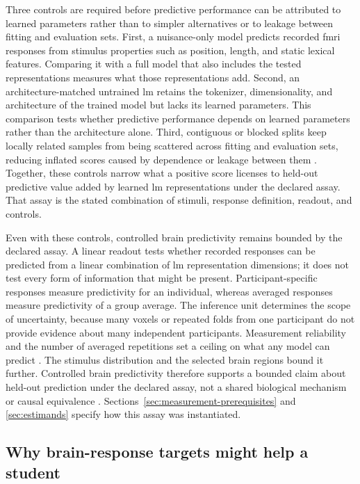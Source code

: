 Three controls are required before predictive performance can be attributed to learned parameters rather than to simpler alternatives or to leakage between fitting and evaluation sets.
First, a nuisance-only model predicts recorded \ac{fmri} responses from stimulus properties such as position, length, and static lexical features.
Comparing it with a full model that also includes the tested representations measures what those representations add.
Second, an architecture-matched untrained \ac{lm} retains the tokenizer, dimensionality, and architecture of the trained model but lacks its learned parameters.
This comparison tests whether predictive performance depends on learned parameters rather than the architecture alone.
Third, contiguous or blocked splits keep locally related samples from being scattered across fitting and evaluation sets, reducing inflated scores caused by dependence or leakage between them \autocite{hadidi2026}.
Together, these controls narrow what a positive score licenses to held-out predictive value added by learned \ac{lm} representations under the declared assay.
That assay is the stated combination of stimuli, response definition, readout, and controls.

Even with these controls, controlled brain predictivity remains bounded by the declared assay.
A linear readout tests whether recorded responses can be predicted from a linear combination of \ac{lm} representation dimensions; it does not test every form of information that might be present.
Participant-specific responses measure predictivity for an individual, whereas averaged responses measure predictivity of a group average.
The inference unit determines the scope of uncertainty, because many voxels or repeated folds from one participant do not provide evidence about many independent participants.
Measurement reliability and the number of averaged repetitions set a ceiling on what any model can predict \autocite{lage2019}.
The stimulus distribution and the selected brain regions bound it further.
Controlled brain predictivity therefore supports a bounded claim about held-out prediction under the declared assay, not a shared biological mechanism or causal equivalence \autocite{jia2026}.
Sections~\ref{sec:measurement-prerequisites} and \ref{sec:estimands} specify how this assay was instantiated.

\subsection{Why brain-response targets might help a student}
\label{sec:target-rationale}

